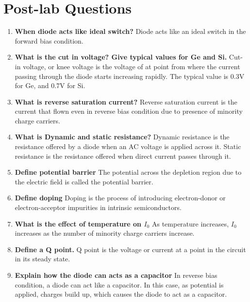 \documentclass{article}
\begin{document}
	\section{Post-lab Questions}
	\begin{enumerate}
		\item \textbf{When diode acts like ideal switch?} Diode acts like an ideal switch in the forward bias condition.
		\item \textbf{What is the cut in voltage? Give typical values for Ge and Si.} Cut-in voltage, or knee voltage is the voltage of at point from where the current passing through the diode starts increasing rapidly. The typical value is 0.3V for Ge, and 0.7V for Si.
		\item \textbf{What is reverse saturation current?} Reverse saturation current is the current that flown even in reverse bias condition due to presence of minority charge carriers.
		\item \textbf{What is Dynamic and static resistance?} Dynamic resistance is the resistance offered by a diode when an AC voltage is applied across it. Static resistance is the resistance offered when direct current passes through it. 
		\item \textbf{Define potential barrier} The potential across the depletion region due to the electric field is called the potential barrier.
		\item \textbf{Define doping} Doping is the process of introducing electron-donor or electron-acceptor impurities in intrinsic semiconductors.
		\item \textbf{What is the effect of temperature on $ I_0 $} As temperature increases, $ I_0 $ increases as the number of minority charge carriers increase.
		\item \textbf{Define a Q point.} Q point is the voltage or current at a point in the circuit in its steady state.
		\item \textbf{Explain how the diode can acts as a capacitor} In reverse bias condition, a diode can act like a capacitor. In this case, as potential is applied, charges build up, which causes the diode to act as a capacitor.
	\end{enumerate}
\end{document}
